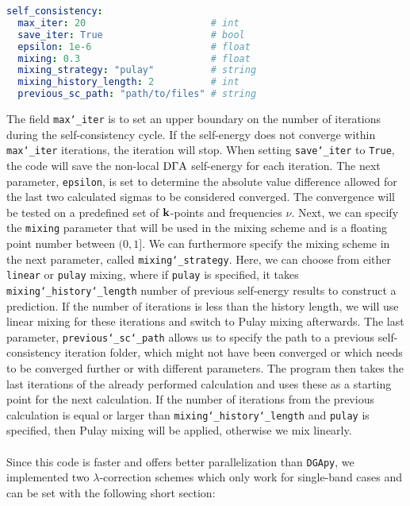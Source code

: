 \documentclass[../../main.tex]{subfiles}
\begin{document}
\begin{minipage}{\textwidth}%
\begin{lstlisting}[language=yaml]
self_consistency:
  max_iter: 20                      # int
  save_iter: True                   # bool
  epsilon: 1e-6                     # float
  mixing: 0.3                       # float
  mixing_strategy: "pulay"          # string
  mixing_history_length: 2          # int
  previous_sc_path: "path/to/files" # string
\end{lstlisting}
\end{minipage}
The field \texttt{max\char`_iter} is to set an upper boundary on the number of iterations during the self-consistency cycle. If the self-energy does not converge within \texttt{max\char`_iter} iterations, the iteration will stop. When setting \texttt{save\char`_iter} to \texttt{True}, the code will save the non-local $\text{D}\Gamma\text{A}$ self-energy for each iteration. The next parameter, \texttt{epsilon}, is set to determine the absolute value difference allowed for the last two calculated sigmas to be considered converged. The convergence will be tested on a predefined set of $\textbf{k}$-points and frequencies $\nu$. Next, we can specify the \texttt{mixing} parameter that will be used in the mixing scheme and is a floating point number between $(0,1]$. We can furthermore specify the mixing scheme in the next parameter, called \texttt{mixing\char`_strategy}. Here, we can choose from either \texttt{linear} or \texttt{pulay} mixing, where if \texttt{pulay} is specified, it takes \texttt{mixing\char`_history\char`_length} number of previous self-energy results to construct a prediction. If the number of iterations is less than the history length, we will use linear mixing for these iterations and switch to Pulay mixing afterwards. The last parameter, \texttt{previous\char`_sc\char`_path} allows us to specify the path to a previous self-consistency iteration folder, which might not have been converged or which needs to be converged further or with different parameters. The program then takes the last iterations of the already performed calculation and uses these as a starting point for the next calculation. If the number of iterations from the previous calculation is equal or larger than \texttt{mixing\char`_history\char`_length} and \texttt{pulay} is specified, then Pulay mixing will be applied, otherwise we mix linearly.
\\\\
Since this code is faster and offers better parallelization than \texttt{DGApy}, we implemented two $\lambda$-correction schemes which only work for single-band cases and can be set with the following short section:
\end{document}
